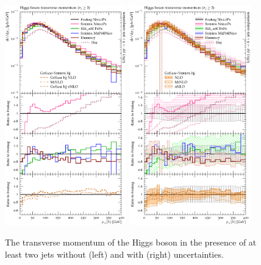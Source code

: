 \begin{figure}[t!]
  \centering
  \includegraphics[width=0.47\textwidth]{figures/hjetscomp_u_H_jj_pT_incl.pdf}
  \hfill
  \includegraphics[width=0.47\textwidth]{figures/hjetscomp_H_jj_pT_incl.pdf}
  \caption{
    The transverse momentum of the Higgs boson in the presence
    of at least two jets without (left) and with (right) uncertainties.
    \label{fig:higgscomp:results:2obs:hpt_j2pt}
  }
\end{figure}

